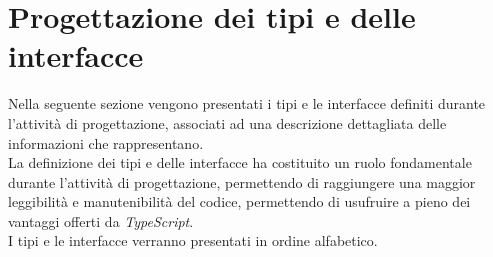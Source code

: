 \section{Progettazione dei tipi e delle interfacce}
Nella seguente sezione vengono presentati i tipi e le interfacce definiti durante l'attività di progettazione, associati ad una descrizione dettagliata
delle informazioni che rappresentano. \\
La definizione dei tipi e delle interfacce ha costituito un ruolo fondamentale durante l'attività di progettazione, permettendo di raggiungere una maggior
leggibilità e manutenibilità del codice, permettendo di usufruire a pieno dei vantaggi offerti da \textit{TypeScript}. \\
I tipi e le interfacce verranno presentati in ordine alfabetico.

